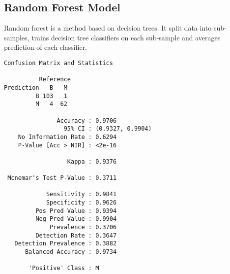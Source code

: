 \documentclass[]{article}
\newenvironment{Shaded}{\begin{snugshade}}{\end{snugshade}}
\newcommand{\DataTypeTok}[1]{\textcolor[rgb]{0.13,0.29,0.53}{#1}}
\newcommand{\KeywordTok}[1]{\textcolor[rgb]{0.13,0.29,0.53}{\textbf{#1}}}
\newcommand{\NormalTok}[1]{#1}
\newcommand{\OperatorTok}[1]{\textcolor[rgb]{0.81,0.36,0.00}{\textbf{#1}}}
\newcommand{\StringTok}[1]{\textcolor[rgb]{0.31,0.60,0.02}{#1}}
\begin{document}
\hypertarget{random-forest-model}{%
\subsection{Random Forest Model}\label{random-forest-model}}

Random forest is a method based on decision trees. It split data into
sub-samples, trains decision tree classifiers on each sub-sample and
averages prediction of each classifier.

\begin{Shaded}
\end{Shaded}

\begin{verbatim}
Confusion Matrix and Statistics

          Reference
Prediction   B   M
         B 103   1
         M   4  62
                                          
               Accuracy : 0.9706          
                 95% CI : (0.9327, 0.9904)
    No Information Rate : 0.6294          
    P-Value [Acc > NIR] : <2e-16          
                                          
                  Kappa : 0.9376          
                                          
 Mcnemar's Test P-Value : 0.3711          
                                          
            Sensitivity : 0.9841          
            Specificity : 0.9626          
         Pos Pred Value : 0.9394          
         Neg Pred Value : 0.9904          
             Prevalence : 0.3706          
         Detection Rate : 0.3647          
   Detection Prevalence : 0.3882          
      Balanced Accuracy : 0.9734          
                                          
       'Positive' Class : M               
                                          
\end{verbatim}
\end{document}
